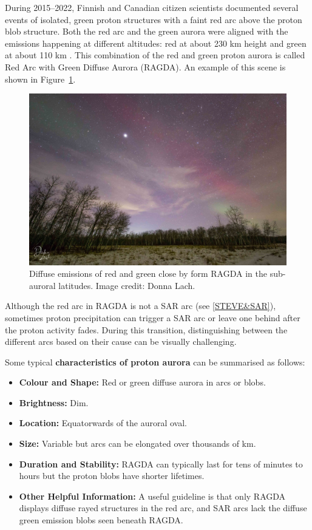 \documentclass{article}
\renewcommand{\cite}[1]{\parencite{#1}}
\begin{document}
During 2015--2022, Finnish and Canadian citizen scientists documented several events of isolated, green proton structures with a faint red arc above the proton blob structure. Both the red arc and the green aurora were aligned with the emissions happening at different altitudes: red at about 230 km height and green at about 110 km \cite{Nishimura2022}. This combination of the red and green proton aurora is called Red Arc with Green Diffuse Aurora (RAGDA). An example of this scene is shown in Figure~\ref{RAGDAExample}.


\begin{figure}[h!]
  \includegraphics[width=0.9\linewidth]{Fig10_RAGDA_DonnaLach.jpg}
  \caption{Diffuse emissions of red and green close by form RAGDA in the sub-auroral latitudes. Image credit: Donna Lach.}
  \label{RAGDAExample}
\end{figure}

Although the red arc in RAGDA is not a SAR arc (see \ref{STEVE&SAR}), sometimes proton precipitation can trigger a SAR arc or leave one behind after the proton activity fades. During this transition, distinguishing between the different arcs based on their cause can be visually challenging. 

Some typical {\bf characteristics of proton aurora} can be summarised as follows:
\begin{itemize}
    \item \textbf{Colour and Shape:} Red or green diffuse aurora in arcs or blobs.
    \item \textbf{Brightness:} Dim.
    \item \textbf{Location:} Equatorwards of the auroral oval.
    \item \textbf{Size:} Variable but arcs can be elongated over thousands of km.
    \item \textbf{Duration and Stability:} RAGDA can typically last for tens of minutes to hours but the proton blobs have shorter lifetimes.
    \item \textbf{Other Helpful Information:} A useful guideline is that only RAGDA displays diffuse rayed structures in the red arc, and SAR arcs lack the diffuse green emission blobs seen beneath RAGDA.  
    \end{itemize}
\end{document}
